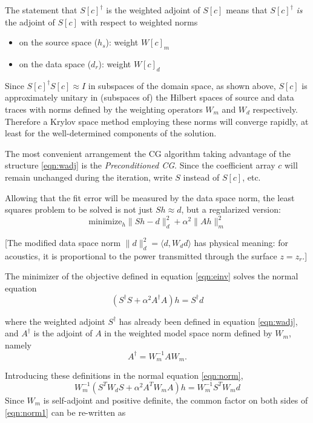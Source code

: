 The statement that $S[c]^{\dagger}$ is the weighted adjoint of $S[c]$ means that $S[c]^{\dagger}$ {\em is} the adjoint of $S[c]$ with respect to weighted norms 
\begin{itemize}
\item on the source space ($h_s$): weight $W[c]_m$
\item on the data space ($d_r$): weight $W[c]_d$
\end{itemize}
Since $S[c]^{\dagger}S[c] \approx I$ in subspaces of the domain space, as shown above, $S[c]$ is approximately unitary in (subspaces of) the Hilbert spaces of source and data traces with norms defined by the weighting operators $W_m$ and $W_d$ respectively. Therefore a Krylov space method employing these norms will converge rapidly, at least for the well-determined components of the solution.

The most convenient arrangement the CG algorithm taking advantage of the structure \ref{eqn:wadj} is the {\em Preconditioned CG}. Since the coefficient array $c$ will remain unchanged during the iteration, write $S$ instead of $S[c]$, etc. 

Allowing that the fit error will be measured by the data space norm, the least squares problem to be solved is not just $Sh \approx d$, but a regularized version:
\begin{equation}
  \label{eqn:einv}
  \mbox{minimize}_h \|Sh-d\|^2_d + \alpha^2 \|Ah\|^2_m
\end{equation}

[The modified data space norm $\|d\|_d^2 = \langle d, W_d d\rangle$ has physical meaning: for acoustics, it is proportional to the power transmitted through the surface $z=z_r$.]

The minimizer of the objective defined in equation \ref{eqn:einv} solves the normal equation
\begin{equation}
  \label{eqn:norm}
  (S^{\dagger}S + \alpha^2 A^{\dagger}A)h = S^{\dagger}d 
\end{equation}

where the weighted adjoint $S^{\dagger}$ has already been defined in equation \ref{eqn:wadj}, and $A^{\dagger}$ is the adjoint of $A$ in the weighted model space norm defined by $W_m$, namely
\begin{equation}
  \label{eqn:aadj}
  A^{\dagger} = W_m^{-1}A W_m.
\end{equation}

Introducing these definitions in the normal equation \ref{eqn:norm},
\begin{equation}
  \label{eqn:norm1}
  W_m^{-1}(S^TW_dS + \alpha^2 A^TW_mA)h = W_m^{-1}S^TW_md 
\end{equation}
Since $W_m$ is self-adjoint and positive definite, the common factor on both sides of \ref{eqn:norm1} can be re-written as

